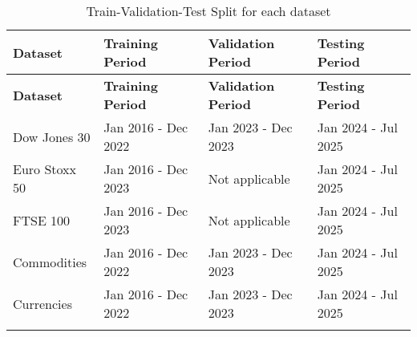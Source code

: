 \begin{longtable}{|l|l|l|l|}
    \hline
    \textbf{Dataset} & \textbf{Training Period} & \textbf{Validation Period} & \textbf{Testing Period} \\ \midrule
    \endfirsthead

    \hline
    \textbf{Dataset} & \textbf{Training Period} & \textbf{Validation Period} & \textbf{Testing Period} \\ \midrule
    \endhead

    \endfoot
    \hline
    Dow Jones 30 & Jan 2016 - Dec 2022 & Jan 2023 - Dec 2023 & Jan 2024 - Jul 2025 \\
    \hline
    Euro Stoxx 50 & Jan 2016 - Dec 2023 & Not applicable & Jan 2024 - Jul 2025 \\
    \hline
    FTSE 100 & Jan 2016 - Dec 2023 & Not applicable & Jan 2024 - Jul 2025 \\
    \hline
    Commodities & Jan 2016 - Dec 2022 & Jan 2023 - Dec 2023 & Jan 2024 - Jul 2025 \\
    \hline
    Currencies & Jan 2016 - Dec 2022 & Jan 2023 - Dec 2023 & Jan 2024 - Jul 2025 \\
    \hline
    \caption{Train-Validation-Test Split for each dataset}
    \label{tab:dataset-split}
\end{longtable}